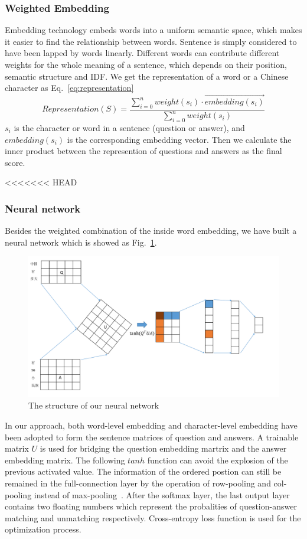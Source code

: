 \documentclass{llncs}
\begin{document}
\begin{table}[!htbp]
\begin{table}[!htbp]
\subsubsection{Weighted Embedding}
\label{sec:embedding}
Embedding technology embeds words into a uniform semantic space, which makes it easier to find the relationship between words. Sentence is simply considered to have been lapped by words linearly. Different words can contribute different weights for the whole meaning of a sentence, which depends on their position, semantic structure and IDF.
We get the representation of a word or a Chinese character as Eq.~\ref{eq:representation}
\begin{equation}
Representation(S) = \frac{\sum_{i=0}^n weight(s_i)\cdot \overrightarrow { embedding(s_i)} }{\sum_{i=0}^n weight(s_i) }
\label{eq:representation}
\end{equation}
$s_i$ is the character or word in a sentence (question or answer), and $embedding(s_i)$ is the corresponding embedding vector. Then we calculate the inner product between the represention of questions and answers as the final score.

<<<<<<< HEAD
\subsubsection{Neural network}
Besides the weighted combination of the inside word embedding, we have built a neural network which is showed as Fig.~\ref{fig:model}. 

\begin{figure}[htb]
\centering
\includegraphics[width=12cm]{figures/nn.pdf}
\caption{ The structure of our neural network}
\label{fig:model}
\end{figure}
In our approach, both word-level embedding and character-level embedding have been adopted to form the sentence matrices of question and answers. A trainable matrix $U$ is used for bridging the question embedding martrix and the answer embedding matrix. The following $tanh$ function can avoid the explosion of the previous activated value. The information of the ordered postion can still be remained in the full-connection layer by the operation of row-pooling and col-pooling instead of max-pooling~\cite{Santos2016Attentive}. After the softmax layer, the last output layer contains two floating numbers which represent the probalities of question-answer matching and unmatching respectively. Cross-entropy loss function is used for the optimization process.


\end{table}
\end{table}
\end{document}

